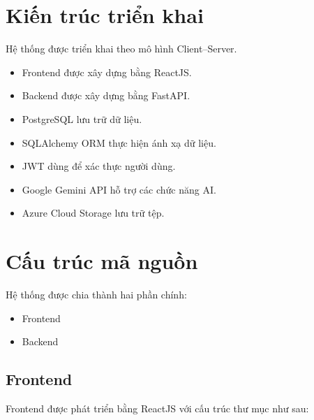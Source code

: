 
\section{Kiến trúc triển khai}

Hệ thống được triển khai theo mô hình Client--Server.

\begin{itemize}

\item Frontend được xây dựng bằng ReactJS.

\item Backend được xây dựng bằng FastAPI.

\item PostgreSQL lưu trữ dữ liệu.

\item SQLAlchemy ORM thực hiện ánh xạ dữ liệu.

\item JWT dùng để xác thực người dùng.

\item Google Gemini API hỗ trợ các chức năng AI.

\item Azure Cloud Storage lưu trữ tệp.

\end{itemize}


\section{Cấu trúc mã nguồn}

Hệ thống được chia thành hai phần chính:

\begin{itemize}

\item Frontend

\item Backend

\end{itemize}

\subsection{Frontend}

Frontend được phát triển bằng ReactJS với cấu trúc thư mục như sau:

